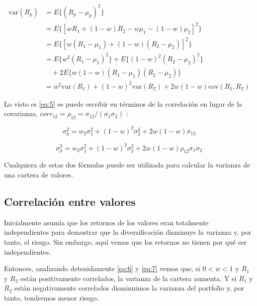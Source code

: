 \begin{equation} \label{eq:5}
\begin{aligned}
    \text{var}(R_{p}) &= E \{(R_{p} - \mu_{p})^{2}\} \\
    &= E\{[wR_{1} + (1-w)R_{2} - w\mu_{1} - (1-w)\mu_{2}]^{2}\} \\
    &= E\{[w(R_{1} - \mu_{1}) + (1-w)(R_{2} - \mu_{2})]^{2}\} \\
    &= E\{w^{2}(R_{1}-\mu_{1})^{2}\} + E\{(1-w)^{2}(R_{2}-\mu_{2})^{2}\} \\
    &\quad + 2E\{w(1-w)(R_{1}-\mu_{1})(R_{2}-\mu_{2})\} \\
    &= w^{2}\text{var}(R_{1}) + (1-w)^{2}\text{var}(R_{2})+2w(1-w)\text{cov}(R_{1}, R_{2})
\end{aligned}
\end{equation}

Lo visto es \ref{eq:5} se puede escribir en términos de la correlación en lugar de la covarianza, $corr_{12} = \rho_{12} = \sigma_{12}/(\sigma_{1}\sigma_{2})$ \citep{wiki:covarianza_correlacion}:

\begin{equation} \label{eq:6}
	\sigma_{p}^{2} = w_{2}\sigma_{1}^{2} + (1-w)^{2}\sigma_{2}^2 + 2w(1-w)\sigma_{12}
\end{equation}

\begin{equation} \label{eq:7}
	\sigma_{p}^{2} = w_{2}\sigma_{1}^{2} + (1-w)^{2}\sigma_{2}^2 + 2w(1-w)\rho_{12} \sigma_{1}\sigma_{2}
\end{equation}
	

Cualquiera de estas dos fórmulas puede ser utilizada para calcular la varianza de una cartera de valores. 

\subsection{Correlación entre valores}

Inicialmente asumía que los retornos de los valores eran totalmente independientes para demostrar que la diversificación disminuye la varianza y, por tanto, el riesgo. Sin embargo, aquí vemos que los retornos no tienen por qué ser independientes. 

Entonces, analizando detenidamente \ref{eq:6} y \ref{eq:7} vemos que, si $0 < w < 1$ y $R_{1}$ y $R_{2}$ están positivamente correlados, la varianza de la cartera aumenta. Y si $R_{1}$ y $R_{2}$ están negativamente correlados disminuimos la varianza del portfolio y, por tanto, tendremos menor riesgo. 


